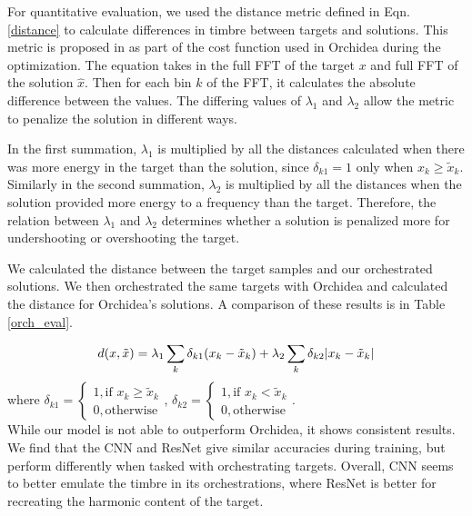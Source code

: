 \documentclass{article}
\begin{document}
For quantitative evaluation, we used the distance metric defined in Eqn. \eqref{distance} to calculate differences in timbre between targets and solutions. This metric is proposed in \cite{Cella2020} as part of the cost function used in Orchidea during the optimization. The equation takes in the full FFT of the target $x$ and full FFT of the solution $\hat{x}$. Then for each bin $k$ of the FFT, it calculates the absolute difference between the values. The differing values of $\lambda_1$ and $\lambda_2$ allow the metric to penalize the solution in different ways. 

In the first summation, $\lambda_1$ is multiplied by all the distances calculated when there was more energy in the target than the solution, since $\delta_{k1} = 1$ only when $x_k \ge \tilde{x}_k$. Similarly in the second summation, $\lambda_2$ is multiplied by all the distances when the solution provided more energy to a frequency than the target. Therefore, the relation between $\lambda_1$ and $\lambda_2$ determines whether a solution is penalized more for undershooting or overshooting the target.

We calculated the distance between the target samples and our orchestrated solutions. We then orchestrated the same targets with Orchidea and calculated the distance for Orchidea's solutions. A comparison of these results is in Table \ref{orch_eval}.

\begin{equation}\label{distance}
d(x, \tilde{x}) =\lambda_1 \sum_k \delta_{k1}(x_k - \tilde{x}_k) + \lambda_2 \sum_k \delta_{k2}|x_k - \tilde{x	}_k| \\
\end{equation}
where 
$
\delta_{k1} = 
\begin{cases}
1, \text{if   } x_k \ge \tilde{x}_k \\
0, \text{otherwise}
\end{cases} 
$, $
\delta_{k2} = 
\begin{cases}
1, \text{if   } x_k < \tilde{x}_k \\
0, \text{otherwise}
\end{cases}.
$\\

While our model is not able to outperform Orchidea, it shows consistent results. We find that the CNN and ResNet give similar accuracies during training, but perform differently when tasked with orchestrating targets. Overall, CNN seems to better emulate the timbre in its orchestrations, where ResNet is better for recreating the harmonic content of the target. 
\end{document}
